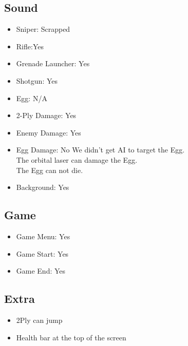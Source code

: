 \documentclass{article}
\begin{document}
\subsection{Sound}
\begin{itemize}
\item Sniper: Scrapped
\item Rifle:Yes
\item Grenade Launcher: Yes
\item Shotgun: Yes
\item Egg: N/A
\item 2-Ply Damage: Yes
\item Enemy Damage: Yes
\item Egg Damage: No
	We didn't get AI to target the Egg.\\
    The orbital laser can damage the Egg.\\
    The Egg can not die.
\item Background: Yes
\end{itemize}

\subsection{Game}
\begin{itemize}
\item Game Menu: Yes
\item Game Start: Yes
\item Game End: Yes
\end{itemize}

\subsection{Extra}
\begin{itemize}
\item 2Ply can jump
\item Health bar at the top of the screen
\end{itemize}
\end{document}
